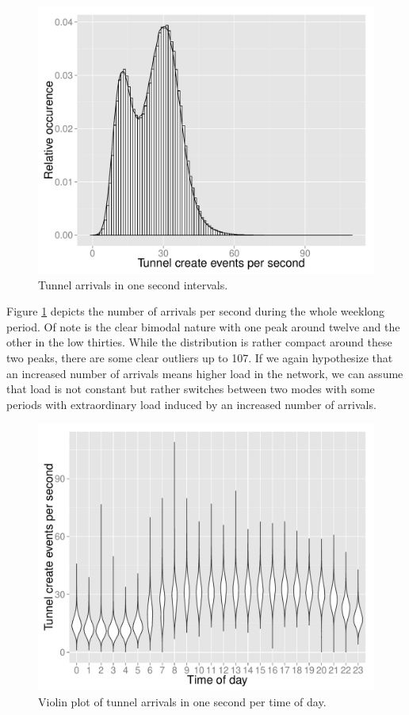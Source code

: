 \begin{figure}[htb]
	\centering
	\includegraphics[width=\columnwidth]{images/create_freq.pdf}
	\caption{Tunnel arrivals in one second intervals.}
	\label{c4:fig:freq-arrivals}
\end{figure}

Figure \ref{c4:fig:freq-arrivals} depicts the number of arrivals per second during the whole weeklong period. Of note is the clear bimodal nature with one peak around twelve and the other in the low thirties. While the distribution is rather compact around these two peaks, there are some clear outliers up to 107.
If we again hypothesize that an increased number of arrivals means higher load in the network, we can assume that load is not constant but rather switches between two modes with some periods with extraordinary load induced by an increased number of arrivals.

\begin{figure}[htb]
	\centering
	\includegraphics[width=\columnwidth]{images/R-createspersecond-1h-violin.pdf}
	\caption{Violin plot of tunnel arrivals in one second per time of day.}
	\label{c4:fig:freq-arrivals-per-second-violin}
\end{figure}

